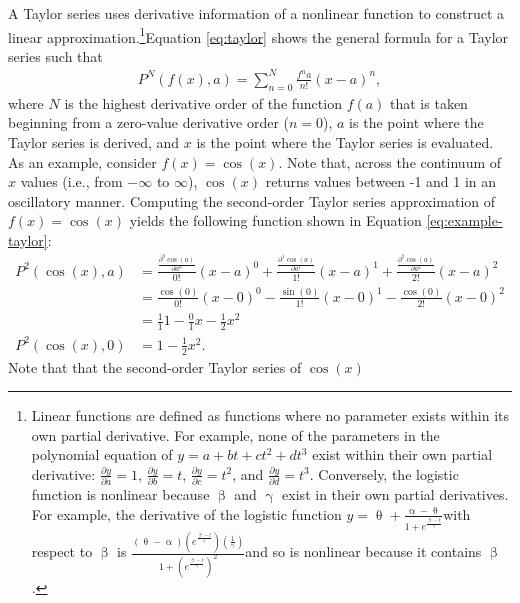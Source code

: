 \documentclass[
12pt, %
twoside,
english]{guelphthesis}
\theoremstyle{definition}
\theoremstyle{definition}
\theoremstyle{definition}
\theoremstyle{definition}
\theoremstyle{remark}
\begin{document}
A Taylor series uses derivative information of a nonlinear function to
construct a linear approximation.\footnote{Linear functions are
defined as functions where no parameter exists within its own partial
derivative. For example, none of the parameters in the polynomial
equation of $y = a + bt + ct^2 + dt^3$ exist within their own partial
derivative: $\frac{\partial y}{\partial a} = 1$,
$\frac{\partial y}{\partial b} = t$,
$\frac{\partial y}{\partial c} = t^2$, and
$\frac{\partial y}{\partial d} = t^3$. Conversely, the logistic function
is nonlinear because $\upbeta$ and $\upgamma$ exist in their own
partial derivatives. For example, the derivative of the logistic function  $y = \uptheta + \frac{\upalpha - \uptheta}{1 + e^{\frac{\upbeta - t}{\upgamma}}} $with respect to $\upbeta$ is $\frac{(\uptheta - \upalpha) (e^{\frac{\upbeta - t}{\upgamma}})(\frac{1}{\upgamma})}{1 + (e^{\frac{\upbeta - t}{\upgamma}})^2}$and so is nonlinear because it contains $\upbeta$.}Equation \ref{eq:taylor} shows the general formula for a Taylor series such that
\begin{align}
P^N(f(x), a)= \sum^{N}_{n = 0} \frac{f^na}{n !}(x-a)^n,
\label{eq:taylor}
\end{align}
\noindent where \(N\) is the highest derivative order of the function \(f(a)\) that is taken beginning from a zero-value derivative order (\(n=0\)), \(a\) is the point where the Taylor series is derived, and \(x\) is the point where the
Taylor series is evaluated. As an example, consider \(f(x) = \cos(x)\). Note that, across the continuum of \(x\) values (i.e., from \(-\infty\) to \(\infty\)), \(\cos(x)\) returns values between -1 and 1 in an oscillatory manner. Computing the second-order Taylor series approximation of \(f(x) = \cos(x)\) yields the following function shown in Equation \ref{eq:example-taylor}:
\begin{align} 
P^2(\cos(x), a) &=  \frac{\frac{\partial^0 \cos(a)}{\partial a^0}}{0!}(x -a)^0 + \frac{\frac{\partial^1 \cos(a)}{\partial a^1}}{1!}(x -a)^1 + \frac{\frac{\partial^2 \cos(a)}{\partial a^2}}{2!} (x -a)^2 \nonumber \\ 
&=  \frac{\cos(0)}{0!}(x -0)^0 - \frac{\sin(0)}{1!}(x -0)^1 - \frac{\cos(0)}{2!}(x -0)^2  \nonumber \\ 
&=  \frac{1}{1}1 - \frac{0}{1}x - \frac{1}{2}x^2  \nonumber \\ 
P^2(\cos(x), 0) &=  1- \frac{1}{2}x^2. 
  \label{eq:example-taylor}
\end{align}
\noindent Note that that the second-order Taylor series of \(\cos(x)\)
\end{document}
